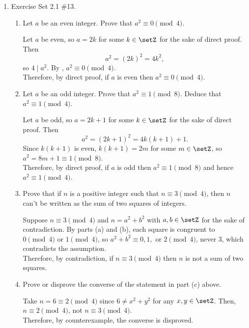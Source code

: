 \begin{enumerate}
\newpage 
\item Exercise Set 2.1 \#13.
\begin{enumerate}
  \item Let $a$ be an even integer. Prove that $a^2 \equiv 0 \pmod{4}$.
  \begin{subprove}
    Let $a$ be even, so $a=2k$ for some $k\in\setZ$ for the sake of direct proof. Then
    \[
      a^2=(2k)^2=4k^2,
    \]
    so $4\mid a^2$. By , $a^2\equiv 0\pmod{4}$.\vspace*{10px}\\
    Therefore, by direct proof, if $a$ is even then $a^2\equiv 0\pmod{4}$.
  \end{subprove}
  \item Let $a$ be an odd integer. Prove that $a^2 \equiv 1 \pmod{8}$. Deduce that $a^2 \equiv 1 \pmod{4}$.
  \begin{subprove}
    Let $a$ be odd, so $a=2k+1$ for some $k\in\setZ$ for the sake of direct proof. Then
    \[
      a^2=(2k+1)^2=4k(k+1)+1.
    \]
    Since $k(k+1)$ is even, $k(k+1)=2m$ for some $m\in\setZ$, so $a^2=8m+1\equiv 1\pmod{8}$. \vspace*{10px}\\
    Therefore, by direct proof, if $a$ is odd then $a^2\equiv 1\pmod{8}$ and hence $a^2\equiv 1\pmod{4}$.
  \end{subprove}
  \item Prove that if $n$ is a positive integer such that $n \equiv 3 \pmod{4}$, then $n$ can't be written as the sum of
  two squares of integers.
  \begin{subprove}
    Suppose $n\equiv 3\pmod{4}$ and $n=a^2+b^2$ with $a,b\in\setZ$ for the sake of contradiction. 
    By parts (a) and (b), each square is congruent to $0\pmod{4}$ or $1\pmod{4}$, 
    so $a^2+b^2\equiv 0,1,$ or $2\pmod{4}$, never $3$, which contradicts the assumption.\vspace*{10px}\\
    Therefore, by contradiction, if $n\equiv 3\pmod{4}$ then $n$ is not a sum of two squares.
  \end{subprove}
  \item Prove or disprove the converse of the statement in part (c) above.
  \begin{subdisprove}
    Take $n=6\equiv 2\pmod{4}$ since $6\ne x^2+y^2$ for any $x,y\in\setZ$. 
    Then, $n\equiv 2\pmod{4}$, not $n\equiv 3\pmod{4}.$\vspace*{10px}\\
    Therefore, by counterexample, the converse is disproved.
  \end{subdisprove}
\end{enumerate}






\end{enumerate}
